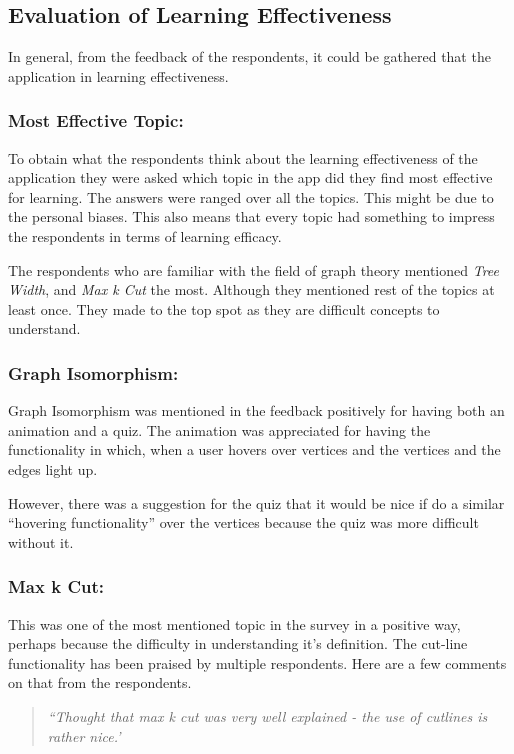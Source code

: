 \subsection{Evaluation of Learning Effectiveness}
In general, from the feedback of the respondents, it could be gathered
that the application in learning effectiveness.

\subsubsection{Most Effective Topic:}
To obtain what the respondents think about the learning effectiveness of the
application they were asked which topic in the app did they find most effective
for learning. The answers were ranged over all the topics. This might be due to
the personal biases. This also means that every topic had something to impress
the respondents in terms of learning efficacy.

The respondents who are familiar with the field of graph theory mentioned
\emph{Tree Width}, and \emph{Max k Cut} the most. Although they mentioned rest
of the topics at least once. They made to the top spot as they are difficult
concepts to understand.

\subsubsection{Graph Isomorphism:}
Graph Isomorphism was mentioned in the feedback positively for having both an
animation and a quiz. The animation was appreciated for having the
functionality in which, when a user hovers over vertices and the vertices and
the edges light up. 

However, there was a suggestion for the quiz 
that it would be nice if do a similar ``hovering functionality'' over the
vertices because the quiz was more difficult without it.

\subsubsection{Max k Cut:}
This was one of the most mentioned topic in the survey in a positive way,
perhaps because the difficulty in understanding it's definition. The cut-line
functionality has been praised by multiple respondents. Here are a few
comments on that from the respondents.

\begin{quote}
\emph{``Thought that max k cut was very well explained - the use of cutlines is
rather nice.'}
\end{quote}

